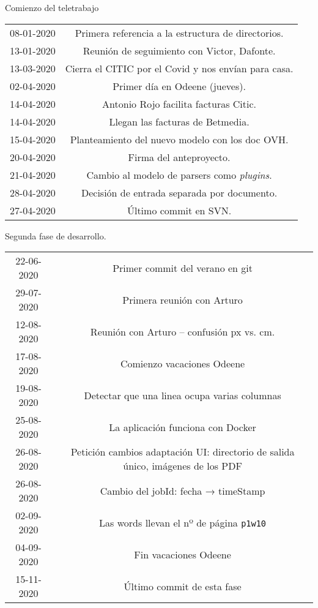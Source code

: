 Comienzo del teletrabajo

\begin{center}
\begin{tabular}{ |c|c| }  
 08-01-2020 & Primera referencia a la estructura de directorios. \\
 13-01-2020 & Reunión de seguimiento con Victor, Dafonte. \\
 13-03-2020 & Cierra el CITIC por el Covid y nos envían para casa. \\
 02-04-2020 & Primer día en Odeene (jueves). \\
 14-04-2020 & Antonio Rojo facilita facturas Citic. \\
 14-04-2020 & Llegan las facturas de Betmedia. \\
 15-04-2020 & Planteamiento del nuevo modelo con los doc OVH. \\
 20-04-2020 & Firma del anteproyecto. \\
 21-04-2020 & Cambio al modelo de parsers como \emph{plugins}. \\
 28-04-2020 & Decisión de entrada separada por documento. \\
 27-04-2020 & Último commit en SVN. \\
\end{tabular}
\end{center} 

Segunda fase de desarrollo.

\begin{center}
\begin{tabular}{ |c|c| }  
 22-06-2020 & Primer commit del verano en git \\
 29-07-2020 & Primera reunión con Arturo \\
 12-08-2020 & Reunión con Arturo – confusión px vs. cm. \\
 17-08-2020 & Comienzo vacaciones Odeene \\
 19-08-2020 & Detectar que una linea ocupa varias columnas \\
 25-08-2020 & La aplicación funciona con Docker \\
 26-08-2020 & Petición cambios adaptación UI: directorio de salida único, imágenes de los PDF \\
 26-08-2020 & Cambio del jobId: fecha → timeStamp \\
 02-09-2020 & Las words llevan el nº de página \verb|p1w10| \\
 04-09-2020 & Fin vacaciones Odeene \\
 15-11-2020 & Último commit de esta fase
\end{tabular}
\end{center}

